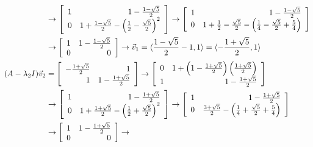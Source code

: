 \documentclass{letter}
\newcommand{\Ve}[1]{\langle #1 \rangle}
\newcommand{\Vn}[1]{\vec{#1}}
\newcommand{\?}{\stackrel{?}{=}}
\newenvironment{Mat}[1]{%
  \left[\begin{array}{*{#1}{r}}
}{%
  \end{array}\right]
}
\begin{document}
\begin{enumerate}
\begin{enumerate}[label=(\alph*)]
{\begin{align*}
                                &\to \begin{Mat}{2} 1 & 1-\frac{1-\sqrt{5}}{2} \\
                                                    0 & 1+\frac{1-\sqrt{5}}{2}-\left(\frac{1}{2}-\frac{\sqrt{5}}{2}\right)^2 \end{Mat}
                                 \to \begin{Mat}{2} 1 & 1-\frac{1-\sqrt{5}}{2} \\
                                                    0 & 1 + \frac{1}{2}-\frac{\sqrt{5}}{2} -
                                                    \left(\frac{1}{4} -\frac{\sqrt{5}}{2} + \frac{5}{4}\right) \end{Mat}\\
                                 &\to \begin{Mat}{2} 1 & 1-\frac{1-\sqrt{5}}{2} \\ 0 & 0 \end{Mat} \to 
                          \Vn{v}_1 = \Ve{\frac{1-\sqrt{5}}{2}-1,1} = \Ve{-\frac{1+\sqrt{5}}{2}, 1}\\
          (A-\lambda_2 I)\Vn{v}_2 &= \begin{Mat}{2} -\frac{1+\sqrt{5}}{2} & 1 \\ 1 & 1-\frac{1+\sqrt{5}}{2} \end{Mat} \to
                                     \begin{Mat}{2} 0 & 1+\left(1-\frac{1+\sqrt{5}}{2}\right)\left(\frac{1+\sqrt{5}}{2}\right) \\
                                                    1 & 1-\frac{1+\sqrt{5}}{2} \end{Mat} \\
                                &\to \begin{Mat}{2} 1 & 1-\frac{1+\sqrt{5}}{2} \\
                                                    0 & 1+\frac{1+\sqrt{5}}{2} - \left(\frac{1}{2}+\frac{\sqrt{5}}{2}\right)^2 \end{Mat}
                                 \to \begin{Mat}{2} 1 & 1-\frac{1+\sqrt{5}}{2} \\
                                                    0 & \frac{3+\sqrt{5}}{2} - 
                                                    \left(\frac{1}{4} + \frac{\sqrt{5}}{2} + \frac{5}{4}\right)\end{Mat} \\
                                &\to \begin{Mat}{2} 1 & 1-\frac{1+\sqrt{5}}{2} \\ 0 & 0 \end{Mat} \to

\end{align*}}
\end{enumerate}
\end{enumerate}
\end{document}
